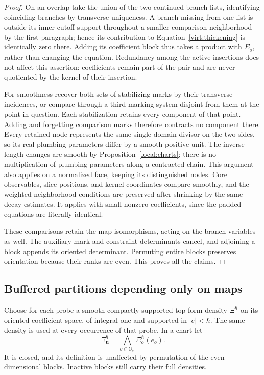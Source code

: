 \documentclass[11pt]{article}
\theoremstyle{definition}
\theoremstyle{remark}
\numberwithin{equation}{section}
\begin{document}
\begin{proof}
On an overlap take the union of the two continued branch lists, identifying
coinciding branches by transverse uniqueness.  A branch missing from
one list is outside its inner cutoff support throughout a smaller
comparison neighborhood by the first paragraph; hence its contribution
to Equation~\eqref{virt:thickening} is identically zero there.  Adding its
coefficient block thus takes a product with $E_o$, rather than changing
the equation.  Redundancy among the active insertions does not affect
this assertion: coefficients remain part of the pair and are never
quotiented by the kernel of their insertion.

For smoothness recover both sets of stabilizing marks by their transverse
incidences, or compare through a third marking system disjoint from them
at the point in question.  Each stabilization retains every component
of that point.  Adding and forgetting comparison marks therefore
contracts no component there.  Every retained node represents the same
single domain divisor on the two sides, so its real plumbing parameters
differ by a smooth positive unit.  The inverse-length changes are smooth
by Proposition~\ref{local:charts}; there is no multiplication of plumbing
parameters along a contracted chain.  This argument also applies on a
normalized face, keeping its distinguished nodes.  Core observables,
slice positions, and kernel coordinates compare smoothly, and the
weighted neighborhood conditions are preserved after shrinking by the
same decay estimates.  It applies with small nonzero coefficients,
since the padded equations are literally identical.

These comparisons retain the map isomorphisms, acting on the branch
variables as well.  The auxiliary mark and constraint determinants
cancel, and adjoining a block appends its oriented determinant.
Permuting entire blocks preserves orientation because their ranks are
even.  This proves all the claims.
\end{proof}

\subsection{Buffered partitions depending only on maps}

Choose for each probe a smooth compactly supported top-form density
$\Xi^\hbar$ on its oriented coefficient space, of integral one and
supported in $|e|<\hbar$.  The same density is used at every occurrence
of that probe.  In a chart let
\begin{equation}\label{virt:density}
 \Xi_{\mathbf u}^\hbar
       =\bigwedge_{o\in O_{\mathbf u}}\Xi_o^\hbar(e_o).
\end{equation}
It is closed, and its definition is unaffected by permutation of the
even-dimensional blocks.  Inactive blocks still carry their full
densities.
\end{document}
